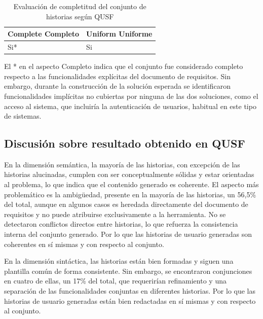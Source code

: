 \begin{table}[h!]
\centering
\small
\begin{tabular}{|p{1.5cm}|p{1.5cm}|}
\hline
\textbf{Complete} \newline Completo & \textbf{Uniform} \newline Uniforme  \\ \hline
Si* & Si \\\hline
\end{tabular}
\caption{Evaluación de completitud del conjunto de historias según QUSF}
\label{table:prag2}
\end{table}

El * en el aspecto Completo indica que el conjunto fue considerado completo respecto a las funcionalidades explícitas del documento de requisitos. Sin embargo, durante la construcción de la solución esperada se identificaron funcionalidades implícitas no cubiertas por ninguna de las dos soluciones, como el acceso al sistema, que incluiría la autenticación de usuarios, habitual en este tipo de sistemas.

\subsection{Discusión sobre resultado obtenido en QUSF}
En la dimensión semántica, la mayoría de las historias, con excepción de las historias alucinadas, cumplen con ser conceptualmente sólidas y estar orientadas al problema, lo que indica que el contenido generado es coherente. El aspecto más problemático es la ambigüedad, presente en la mayoría de las historias, un 56,5\% del total, aunque en algunos casos es heredada directamente del documento de requisitos y no puede atribuirse exclusivamente a la herramienta. No se detectaron conflictos directos entre historias, lo que refuerza la consistencia interna del conjunto generado. Por lo que las historias de usuario generadas son coherentes en sí mismas y con respecto al conjunto.

En la dimensión sintáctica, las historias están bien formadas y siguen una plantilla común de forma consistente. Sin embargo, se encontraron conjunciones en cuatro de ellas, un 17\% del total, que requerirían refinamiento y una separación de las funcionalidades conjuntas en diferentes historias. Por lo que las historias de usuario generadas están bien redactadas en sí mismas y con respecto al conjunto.

